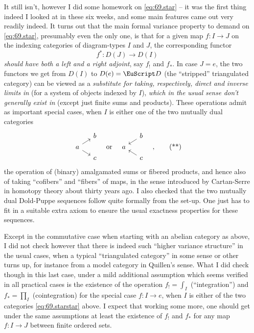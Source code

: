 It still isn't, however I did some homework on \eqref{eq:69.star} --
it was the first thing indeed I looked at in these six weeks, and some
main features came out very readily indeed. It turns out that the main
formal variance property to demand on \eqref{eq:69.star}, presumably
even the only one, is that for a given map $f:I\to J$ on the indexing
categories of diagram-types $I$ and $J$, the corresponding functor
\[f^*: D(J) \to D(I)\]
\emph{should have both a left and a right adjoint}, say $f_!$ and
$f_*$. In case $J=e$, the two functors we get from $D(I)$
to $D(e)=\scrD$ (the ``stripped'' triangulated category) can be viewed
as a \emph{substitute for taking, respectively, direct and inverse
  limits in \scrD} (for a system of objects indexed by $I$),
\emph{which in the usual sense don't generally exist in \scrD} (except
just finite sums and products). These operations admit as important
special cases, when $I$ is either one of the two mutually dual
categories
\begin{equation}
  \label{eq:69.starstar}
  \begin{tikzcd}[baseline=(O.base),column sep=small,row sep=tiny]
    & b \\ |[alias=O]| a\ar[ur]\ar[dr] & \\ & c
  \end{tikzcd}
  \quad\text{or}\quad
  \begin{tikzcd}[baseline=(O.base),column sep=small,row sep=tiny]
    & b\ar[dl] \\ |[alias=O]| a & \\ & c\ar[ul]
  \end{tikzcd}\quad,\tag{**}
\end{equation}
the operation of (binary) amalgamated sums or fibered products, and
hence also of taking ``cofibers'' and ``fibers'' of maps, in the sense
introduced by Cartan-Serre in homotopy theory about thirty years
ago. I also checked that the two mutually dual Dold-Puppe sequences
follow quite formally from the set-up. One just has to fit in a
suitable extra axiom to ensure the usual exactness properties for
these sequences.

Except in the commutative case when starting with an abelian category
as above, I did not check however that there is indeed such ``higher
variance structure'' in the usual cases, when a typical ``triangulated
category'' in some sense or other turns up, for instance from a model
category in Quillen's sense. What I did check though in this last
case, under a mild additional assumption which seems verified in all
practical cases is the existence of the operation $f_!=\int_I$
(``integration'') and $f_*=\prod_I$ (cointegration) for the special
case $f:I\to e$, when $I$ is either of the two categories
\eqref{eq:69.starstar} above. I expect that working some more, one
should get under the same assumptions at least the existence of $f_!$
and $f_*$ for any map $f:I\to J$ between finite ordered sets.

